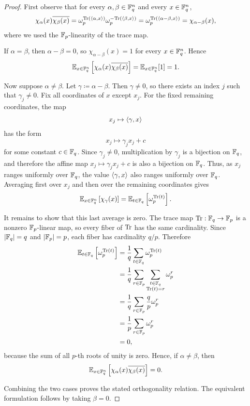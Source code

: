 \begin{proof}\leanok
First observe that for every $\alpha,\beta\in{\mathbb F}_q^n$ and every $x\in{\mathbb F}_q^n$,
\[
    \chi_\alpha(x)\overline{\chi_\beta(x)}
    =
    \omega_p^{{\rm Tr}(\langle \alpha, x \rangle)}
    \omega_p^{-{\rm Tr}(\langle \beta, x \rangle)}
    =
    \omega_p^{{\rm Tr}(\langle \alpha-\beta, x \rangle)}
    =
    \chi_{\alpha-\beta}(x),
\]
where we used the ${\mathbb F}_p$-linearity of the trace map.

If $\alpha=\beta$, then $\alpha-\beta=0$, so $\chi_{\alpha-\beta}(x)=1$ for every
$x\in{\mathbb F}_q^n$. Hence
\[
    {\mathbb E}_{x\in{\mathbb F}_q^n}\left[\chi_\alpha(x)\overline{\chi_\beta(x)}\right]
    =
    {\mathbb E}_{x\in{\mathbb F}_q^n}[1]
    =
    1.
\]

Now suppose $\alpha\ne\beta$. Let $\gamma \coloneqq \alpha-\beta$. Then $\gamma\ne 0$, so there exists
an index $j$ such that $\gamma_j\ne 0$. Fix all coordinates of $x$ except $x_j$. For the fixed
remaining coordinates, the map
\[
    x_j\mapsto \langle \gamma, x \rangle
\]
has the form
\[
    x_j\mapsto \gamma_j x_j + c
\]
for some constant $c\in{\mathbb F}_q$. Since $\gamma_j\ne 0$, multiplication by $\gamma_j$ is a
bijection on ${\mathbb F}_q$, and therefore the affine map $x_j\mapsto \gamma_jx_j+c$ is also a
bijection on ${\mathbb F}_q$. Thus, as $x_j$ ranges uniformly over ${\mathbb F}_q$, the value
$\langle \gamma, x \rangle$ also ranges uniformly over ${\mathbb F}_q$. Averaging first over $x_j$ and then
over the remaining coordinates gives
\[
    {\mathbb E}_{x\in{\mathbb F}_q^n}\left[\chi_\gamma(x)\right]
    =
    {\mathbb E}_{t\in{\mathbb F}_q}\left[\omega_p^{{\rm Tr}(t)}\right].
\]

It remains to show that this last average is zero. The trace map
${\rm Tr}:{\mathbb F}_q\to{\mathbb F}_p$ is a nonzero ${\mathbb F}_p$-linear map, so every fiber of ${\rm Tr}$ has the same
cardinality. Since $\left\lvert{{\mathbb F}_q}\right\rvert=q$ and $\left\lvert{{\mathbb F}_p}\right\rvert=p$, each fiber has cardinality $q/p$.
Therefore
\begin{align*}
    {\mathbb E}_{t\in{\mathbb F}_q}\left[\omega_p^{{\rm Tr}(t)}\right]
    &=
    \frac{1}{q}\sum_{t\in{\mathbb F}_q}\omega_p^{{\rm Tr}(t)} \\
    &=
    \frac{1}{q}\sum_{r\in{\mathbb F}_p}
        \sum_{\substack{t\in{\mathbb F}_q\\ {\rm Tr}(t)=r}}
        \omega_p^r \\
    &=
    \frac{1}{q}\sum_{r\in{\mathbb F}_p}\frac{q}{p}\omega_p^r \\
    &=
    \frac{1}{p}\sum_{r\in{\mathbb F}_p}\omega_p^r \\
    &=0,
\end{align*}
because the sum of all $p$-th roots of unity is zero. Hence, if $\alpha\ne\beta$, then
\[
    {\mathbb E}_{x\in{\mathbb F}_q^n}\left[\chi_\alpha(x)\overline{\chi_\beta(x)}\right]
    =
    0.
\]

Combining the two cases proves the stated orthogonality relation. The equivalent formulation
follows by taking $\beta=0$.
\end{proof}

